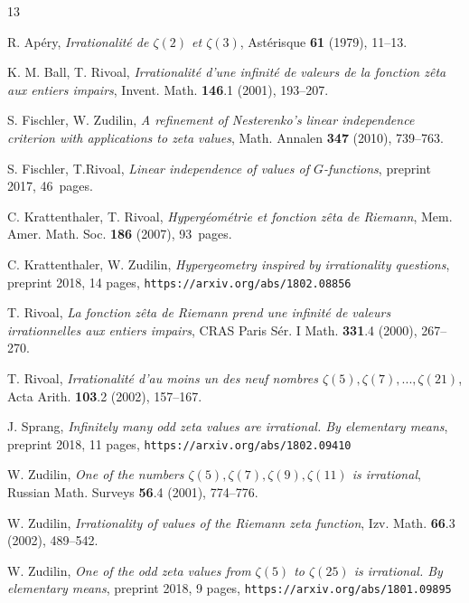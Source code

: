 \documentclass[reqno,12pt]{article}
\theoremstyle{remark}
\begin{document}
\def\refname{Bibliography}
\begin{thebibliography}{13}\label{sec:biblio}

 R. Ap\'ery, {\em Irrationalit\'e de $\zeta(2)$ et $\zeta(3)$}, Ast\'erisque {\bf 61} (1979), 11--13.

 K. M. Ball, T. Rivoal, {\em Irrationalit\'e 
d'une infinit\'e de valeurs de la fonction z\^eta aux entiers impairs}, Invent. Math. {\bf 146}.1 (2001), 193--207.

 S. Fischler, W. Zudilin, {\em A refinement of Nesterenko's linear independence criterion with applications to zeta values}, Math. Annalen {\bf 347} (2010), 739--763.

 S. Fischler, T.Rivoal, {\em Linear independence of values of $G$-functions}, preprint  2017, 46~pages.

 C. Krattenthaler, T. Rivoal, {\em Hyperg\'eom\'etrie et fonction z\^eta de Riemann}, Mem. Amer. Math. Soc. {\bf 186} (2007), 93~pages.

 C. Krattenthaler, W. Zudilin, {\em Hypergeometry inspired by irrationality questions}, preprint 2018, 14 pages, {\tt https://arxiv.org/abs/1802.08856}

 T. Rivoal, {\em La fonction z\^eta de Riemann prend une infinit\'e de valeurs irrationnelles aux entiers impairs}, CRAS Paris S\'er. I Math. {\bf 331}.4 (2000), 267--270.

 T. Rivoal, {\em Irrationalit\'e d'au moins un des neuf nombres $\zeta(5), \zeta(7), ..., \zeta(21)$}, Acta Arith. {\bf 103}.2 (2002), 157--167.

 J. Sprang, {\em Infinitely many odd zeta values are irrational. By elementary means}, preprint 2018, 11 pages, {\tt https://arxiv.org/abs/1802.09410}

 W. Zudilin, 
{\em One of the numbers $\zeta(5), \zeta(7), \zeta(9), \zeta(11)$ is irrational}, Russian Math. Surveys {\bf 56}.4 (2001), 774--776.

 W. Zudilin,  
{\em Irrationality of values of the Riemann zeta function}, 
Izv. Math. {\bf 66}.3 (2002), 489--542.

 W. Zudilin, {\em One of the odd zeta values from $\zeta(5)$ to $\zeta(25)$ is irrational. By elementary means}, preprint 2018, 9 pages, {\tt https://arxiv.org/abs/1801.09895}

\end{thebibliography}
\end{document}

